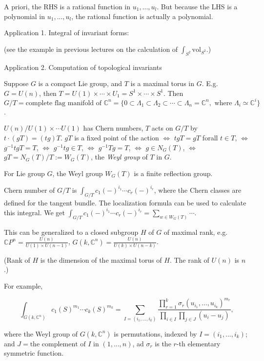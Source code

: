 \documentclass{article}
\theoremstyle{mystyle}
\theoremstyle{remark}
\numberwithin{equation}{section}
\begin{document}
A priori, the RHS is a rational function in $u_1,...,u_l$. But because the LHS is a polynomial in $u_1,...,u_l$, the rational function is actually a polynomial. 

Application 1. Integral of invariant forms:

(see the example in previous lectures on the calculation of $\int_{S^2}\text{vol}_{S^2}$.)

Application 2. Computation of topological invariants

Suppose $G$ is a compact Lie group, and $T$ is a maximal torus in $G$. E.g. $G = U(n)$, then $T = U(1)\times \cdots \times U_1 = S^1\times \cdots \times S^1$. Then $G/T = \text{complete flag manifold of }\mathbb{C}^n = \{0\subset \Lambda_1\subset \Lambda_2\subset \cdots \subset \Lambda_n = \mathbb{C}^n,\text{ where }\Lambda_i \simeq \mathbb{C}^i\}$. 

$U(n)/U(1)\times \cdots U(1)$ has Chern numbers, $T$ acts on $G/T$ by $t\cdot (gT) = (tg)T$. $gT$ is a fixed point of the action $\Leftrightarrow$ $tgT=gT$ forall $t\in T$, $\Leftrightarrow$ $g^{-1}tgT = T$, $\Leftrightarrow$ $g^{-1}tg \in T$, $\Leftrightarrow$ $g^{-1}Tg = T$, $\Leftrightarrow$ $g\in N_G(T)$, $\Leftrightarrow$ $gT = N_G(T)/T:=W_G(T)$, the \emph{Weyl group} of $T$ in $G$.

For Lie group $G$, the Weyl group $W_G(T)$ is a finite reflection group.

Chern number of $G/T$ is
$\int_{G/T} c_1(-)^{i_1}\cdots c_r(-)^{i_r}$, where the Chern classes are defined for the tangent bundle. The localization formula can be used to calculate this integral. We get
$\int_{G/T} c_1(-)^{i_1}\cdots c_r(-)^{i_r} = \sum\limits_{w \in W_G(T)} \cdots$. 

This can be generalized to a closed subgroup $H$ of $G$ of maximal rank, e.g. $\mathbb{C}P^n = \frac{U(n)}{U(1)\times U(n-1)}$, $G(k,\mathbb{C}^n) = \frac{U(n)}{U(k)\times U(n-k)}$. 

(Rank of $H$ is the dimension of the maximal torus of $H$. The rank of $U(n)$ is $n$.)

For example,

$$\int_{G(k,\mathbb{C}^n)} c_1(S)^{m_1}\cdots c_k(S)^{m_k}
=
\sum\limits_{I = (i_1,...,i_k)} \frac{\prod_{r=1}^k \sigma_r(u_{i_1},...,u_{i_k})^{m_r}}{\prod_{i\in I} \prod_{j\in J}(u_i-u_j)},$$

where the Weyl group of $G(k,\mathbb{C}^n)$ is permutations, indexed by $I = (i_1,...,i_k)$; and $J = \text{the complement of }I \text{ in }(1,...,n)$, ad $\sigma_r$ is the $r$-th elementary symmetric function.
\end{document}

